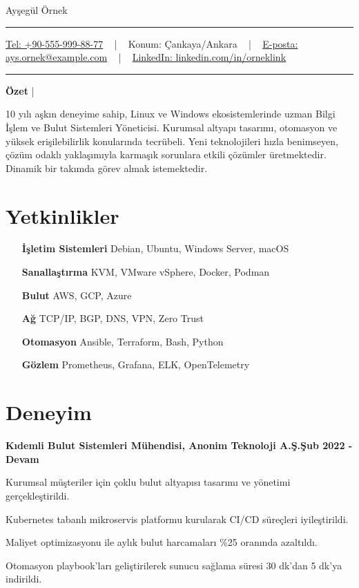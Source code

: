 \documentclass[a4paper,11pt]{article}
\newcommand{\documentTitle}[2]{
  \begin{center}
    {\Huge\color{accentTitle} #1}
    \vspace{10pt}
    {\color{accentLine} \hrule}
    \vspace{2pt}
    \footnotesize{#2}
    \vspace{2pt}
    {\color{accentLine} \hrule}
  \end{center}
}
\newcommand{\tinysection}[1]{
  \phantomsection
  \addcontentsline{toc}{section}{#1}
  {\large{\bfseries\color{accentText}#1} {\color{accentLine} |}}
}
\newcommand{\heading}[2]{
  \hspace{10pt}#1\hfill#2\\
}
\newcommand{\headingBf}[2]{
  \heading{\textbf{#1}}{\textbf{#2}}
}
\newenvironment{resume_list}{
  \vspace{-7pt}
  \begin{itemize}[itemsep=-2px, parsep=1pt, leftmargin=30pt] 
}{
  \end{itemize}
}
\begin{document}
  \documentTitle{Ayşegül Örnek}{
    \href{tel:+905559998877}{
      Tel: +90-555-999-88-77} ~ | ~
      Konum: Çankaya/Ankara ~ | ~
    \href{mailto:ays.ornek@example.com}{
    E-posta: ays.ornek@example.com} ~ | ~
    \href{https://linkedin.com/in/orneklink}{
     LinkedIn: linkedin.com/in/orneklink}
  }

  \tinysection{Özet}
  10 yılı aşkın deneyime sahip, Linux ve Windows ekosistemlerinde uzman Bilgi İşlem ve Bulut Sistemleri Yöneticisi. Kurumsal altyapı tasarımı, otomasyon ve yüksek erişilebilirlik konularında tecrübeli. Yeni teknolojileri hızla benimseyen, çözüm odaklı yaklaşımıyla karmaşık sorunlara etkili çözümler üretmektedir. Dinamik bir takımda görev almak istemektedir.


  \section{Yetkinlikler}

  \begin{multicols}{2}
    \begin{itemize}[itemsep=-2px, parsep=1pt, leftmargin=75pt]
      \item[\textbf{İşletim Sistemleri}] Debian, Ubuntu, Windows Server, macOS
      \item[\textbf{Sanallaştırma}] KVM, VMware vSphere, Docker, Podman
      \item[\textbf{Bulut}] AWS, GCP, Azure
      \item[\textbf{Ağ}] TCP/IP, BGP, DNS, VPN, Zero Trust
      \item[\textbf{Otomasyon}] Ansible, Terraform, Bash, Python
      \item[\textbf{Gözlem}] Prometheus, Grafana, ELK, OpenTelemetry
    \end{itemize}
  \end{multicols}


  \section{Deneyim}

  \headingBf{Kıdemli Bulut Sistemleri Mühendisi, Anonim Teknoloji A.Ş.}{Şub 2022 - Devam}
  \begin{resume_list}
    \item Kurumsal müşteriler için çoklu bulut altyapısı tasarımı ve yönetimi gerçekleştirildi.
    \item Kubernetes tabanlı mikroservis platformu kurularak CI/CD süreçleri iyileştirildi.
    \item Maliyet optimizasyonu ile aylık bulut harcamaları \%25 oranında azaltıldı.
    \item Otomasyon playbook’ları geliştirilerek sunucu sağlama süresi 30 dk’dan 5 dk’ya indirildi.
  \end{resume_list}
\end{document}
